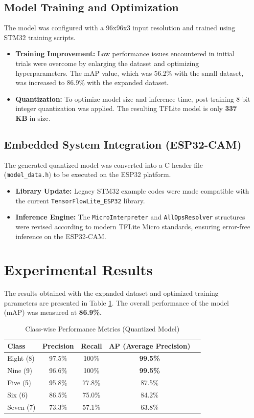 \documentclass{article}
\begin{document}
\subsection{Model Training and Optimization}
The model was configured with a 96x96x3 input resolution and trained using STM32 training scripts.
\begin{itemize}
    \item \textbf{Training Improvement:} Low performance issues encountered in initial trials were overcome by enlarging the dataset and optimizing hyperparameters. The mAP value, which was 56.2\% with the small dataset, was increased to 86.9\% with the expanded dataset.
    \item \textbf{Quantization:} To optimize model size and inference time, post-training 8-bit integer quantization was applied. The resulting TFLite model is only \textbf{337 KB} in size.
\end{itemize}

\subsection{Embedded System Integration (ESP32-CAM)}
The generated quantized model was converted into a C header file (\texttt{model\_data.h}) to be executed on the ESP32 platform.
\begin{itemize}
    \item \textbf{Library Update:} Legacy STM32 example codes were made compatible with the current \texttt{TensorFlowLite\_ESP32} library.
    \item \textbf{Inference Engine:} The \texttt{MicroInterpreter} and \texttt{AllOpsResolver} structures were revised according to modern TFLite Micro standards, ensuring error-free inference on the ESP32-CAM.
\end{itemize}

\section{Experimental Results}
The results obtained with the expanded dataset and optimized training parameters are presented in Table \ref{tab:results}. The overall performance of the model (mAP) was measured at \textbf{86.9\%}.

\begin{table}[h]
\centering
\caption{Class-wise Performance Metrics (Quantized Model)}
\label{tab:results}
\begin{tabular}{@{}lcccc@{}}
\toprule
\textbf{Class} & \textbf{Precision} & \textbf{Recall} & \textbf{AP (Average Precision)} \\ \midrule
Eight (8) & 97.5\% & 100\% & \textbf{99.5\%} \\
Nine (9)  & 96.6\% & 100\% & \textbf{99.5\%} \\
Five (5)  & 95.8\% & 77.8\% & 87.5\% \\
Six (6)   & 86.5\% & 75.0\% & 84.2\% \\
Seven (7) & 73.3\% & 57.1\% & 63.8\% \\ \bottomrule
\end{tabular}
\end{table}
\end{document}
